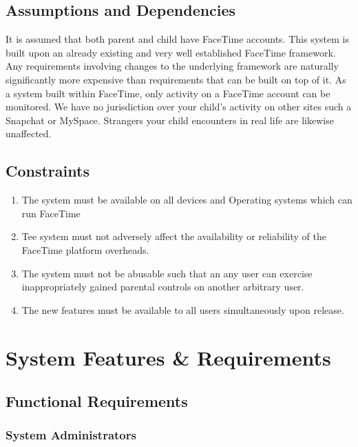 \documentclass[12pt]{article}
\begin{document}
\subsection{Assumptions and Dependencies}

It is assumed that both parent and child have FaceTime accounts. This system is built upon an already existing
and very well established FaceTime framework. Any requirements involving changes to the underlying framework are
naturally significantly more expensive than requirements that can be built on top of it. As a system built within
FaceTime, only activity on a FaceTime account can be monitored. We have no jurisdiction over your child’s activity
on other sites such a Snapchat or MySpace. Strangers your child encounters in real life are likewise unaffected.

\subsection{Constraints}

\begin{enumerate}
    \item The system must be available on all devices and Operating systems which can run FaceTime
    \item Tee system must not adversely affect the availability or reliability of the FaceTime platform overheads.
    \item The system must not be abusable such that an any user can exercise inappropriately gained parental
    controls on another arbitrary user.
    \item The new features must be available to all users simultaneously upon release.
\end{enumerate}

\section {System Features \& Requirements}

\subsection{Functional Requirements}

\subsubsection{System Administrators}
\end{document}

